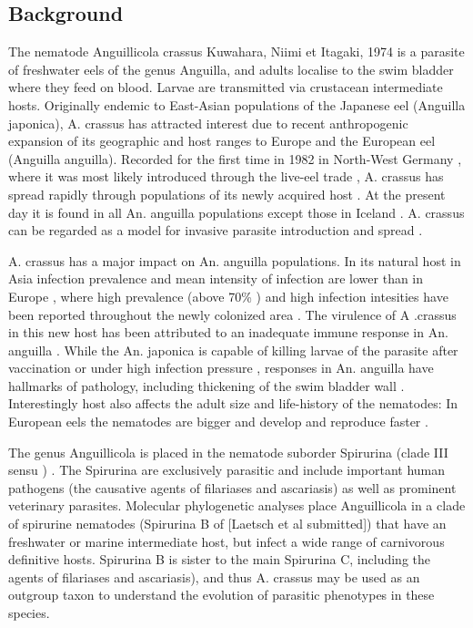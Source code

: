 \documentclass[10pt]{bmc_article}
\newenvironment{bmcformat}{\begin{raggedright}\baselineskip20pt\sloppy\setboolean{publ}{false}}{\end{raggedright}\baselineskip20pt\sloppy}
\begin{document}
\begin{bmcformat}
\section*{Background}
 

The nematode Anguillicola crassus Kuwahara, Niimi et Itagaki, 1974
\cite{kuwahara_Niimi_Itagaki_1974} is a parasite of freshwater eels of
the genus Anguilla, and adults localise to the swim bladder where they
feed on blood. Larvae are transmitted via crustacean intermediate
hosts. Originally endemic to East-Asian populations of the Japanese
eel (Anguilla japonica), A. crassus has attracted interest due to
recent anthropogenic expansion of its geographic and host ranges to
Europe and the European eel (Anguilla anguilla). Recorded for the
first time in 1982 in North-West Germany \cite{fischer_teichwirt},
where it was most likely introduced through the live-eel trade
\cite{koops_anguillicola-infestations_1989, koie_swimbladder_1991},
A. crassus has spread rapidly through populations of its newly
acquired host \cite{kirk_impact_2003}. At the present day it is found
in all An. anguilla populations except those in Iceland
\cite{kristmundsson_parasite_2007}. A. crassus can be regarded as a
model for invasive parasite introduction and spread
\cite{taraschewski_hosts_2007}.

A. crassus has a major impact on An. anguilla populations. In its
natural host in Asia infection prevalence and mean intensity of
infection are lower than in Europe \cite{mnderle_occurrence_2006},
where high prevalence (above 70\% \cite{wrtz_distribution_1998}) and
high infection intesities have been reported throughout the newly
colonized area \cite{lefebvre_anguillicolosis:_2004}. The virulence of
A .crassus in this new host has been attributed to an inadequate
immune response in An. anguilla \cite{knopf_swimbladder_2006}. While
the An.  japonica is capable of killing larvae of the parasite after
vaccination \cite{knopf_vaccination_2008} or under high infection
pressure \cite{heitlinger_massive_2009}, responses in An. anguilla
have hallmarks of pathology, including thickening of the swim bladder
wall \cite{wrtz_histopathological_2000}.  Interestingly host also
affects the adult size and life-history of the nematodes: In European
eels the nematodes are bigger and develop and reproduce faster
\cite{knopf_differences_2004}.


The genus Anguillicola is placed in the nematode suborder Spirurina
(clade III sensu \cite{blaxter_molecular_1998})
\cite{nadler_molecular_2007, wijov_evolutionary_2006}. The Spirurina
are exclusively parasitic and include important human pathogens (the
causative agents of filariases and ascariasis) as well as prominent
veterinary parasites. Molecular phylogenetic analyses place
Anguillicola in a clade of spirurine nematodes (Spirurina B of
[Laetsch et al submitted]) that have an freshwater or marine
intermediate host, but infect a wide range of carnivorous definitive
hosts. Spirurina B is sister to the main Spirurina C, including the
agents of filariases and ascariasis), and thus A. crassus may be used
as an outgroup taxon to understand the evolution of parasitic
phenotypes in these species.


\end{bmcformat}
\end{document}
